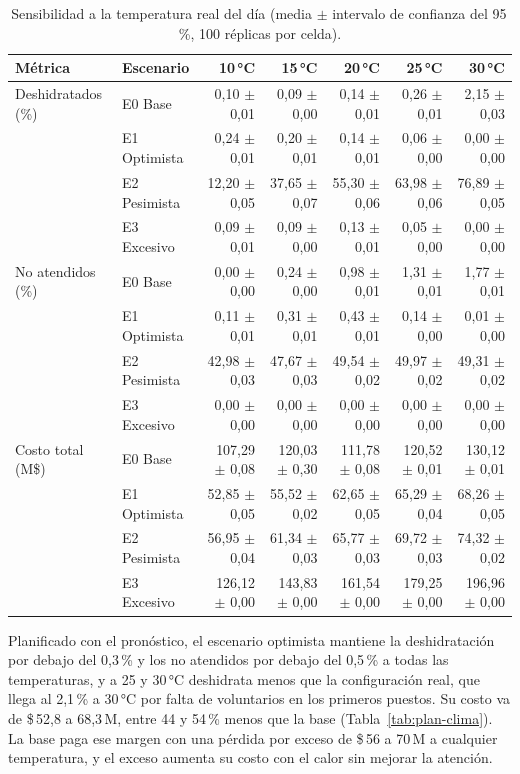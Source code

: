 \documentclass[11pt,a4paper]{article}
\begin{document}
\begin{table}[H]
\centering
\small
\begin{tabular}{llrrrrr}
\toprule
\textbf{Métrica} & \textbf{Escenario} & \textbf{10\,°C} & \textbf{15\,°C} & \textbf{20\,°C} & \textbf{25\,°C} & \textbf{30\,°C} \\
\midrule
Deshidratados (\%) & E0 Base & 0,10 $\pm$ 0,01 & 0,09 $\pm$ 0,00 & 0,14 $\pm$ 0,01 & 0,26 $\pm$ 0,01 & 2,15 $\pm$ 0,03 \\
 & E1 Optimista & 0,24 $\pm$ 0,01 & 0,20 $\pm$ 0,01 & 0,14 $\pm$ 0,01 & 0,06 $\pm$ 0,00 & 0,00 $\pm$ 0,00 \\
 & E2 Pesimista & 12,20 $\pm$ 0,05 & 37,65 $\pm$ 0,07 & 55,30 $\pm$ 0,06 & 63,98 $\pm$ 0,06 & 76,89 $\pm$ 0,05 \\
 & E3 Excesivo & 0,09 $\pm$ 0,01 & 0,09 $\pm$ 0,00 & 0,13 $\pm$ 0,01 & 0,05 $\pm$ 0,00 & 0,00 $\pm$ 0,00 \\
\midrule
No atendidos (\%) & E0 Base & 0,00 $\pm$ 0,00 & 0,24 $\pm$ 0,00 & 0,98 $\pm$ 0,01 & 1,31 $\pm$ 0,01 & 1,77 $\pm$ 0,01 \\
 & E1 Optimista & 0,11 $\pm$ 0,01 & 0,31 $\pm$ 0,01 & 0,43 $\pm$ 0,01 & 0,14 $\pm$ 0,00 & 0,01 $\pm$ 0,00 \\
 & E2 Pesimista & 42,98 $\pm$ 0,03 & 47,67 $\pm$ 0,03 & 49,54 $\pm$ 0,02 & 49,97 $\pm$ 0,02 & 49,31 $\pm$ 0,02 \\
 & E3 Excesivo & 0,00 $\pm$ 0,00 & 0,00 $\pm$ 0,00 & 0,00 $\pm$ 0,00 & 0,00 $\pm$ 0,00 & 0,00 $\pm$ 0,00 \\
\midrule
Costo total (M\$) & E0 Base & 107,29 $\pm$ 0,08 & 120,03 $\pm$ 0,30 & 111,78 $\pm$ 0,08 & 120,52 $\pm$ 0,01 & 130,12 $\pm$ 0,01 \\
 & E1 Optimista & 52,85 $\pm$ 0,05 & 55,52 $\pm$ 0,02 & 62,65 $\pm$ 0,05 & 65,29 $\pm$ 0,04 & 68,26 $\pm$ 0,05 \\
 & E2 Pesimista & 56,95 $\pm$ 0,04 & 61,34 $\pm$ 0,03 & 65,77 $\pm$ 0,03 & 69,72 $\pm$ 0,03 & 74,32 $\pm$ 0,02 \\
 & E3 Excesivo & 126,12 $\pm$ 0,00 & 143,83 $\pm$ 0,00 & 161,54 $\pm$ 0,00 & 179,25 $\pm$ 0,00 & 196,96 $\pm$ 0,00 \\
\bottomrule
\end{tabular}
\caption{Sensibilidad a la temperatura real del día (media $\pm$ intervalo de confianza del 95\,\%, 100 réplicas por celda).}
\label{tab:sensibilidad}
\end{table}

Planificado con el pronóstico, el escenario optimista mantiene la deshidratación por debajo del 0,3\,\% y los no atendidos por debajo del 0,5\,\% a todas las temperaturas, y a 25 y 30\,°C deshidrata menos que la configuración real, que llega al 2,1\,\% a 30\,°C por falta de voluntarios en los primeros puestos. Su costo va de \$\,52,8 a 68,3\,M, entre 44 y 54\,\% menos que la base (Tabla~\ref{tab:plan-clima}). La base paga ese margen con una pérdida por exceso de \$\,56 a 70\,M a cualquier temperatura, y el exceso aumenta su costo con el calor sin mejorar la atención.
\end{document}
